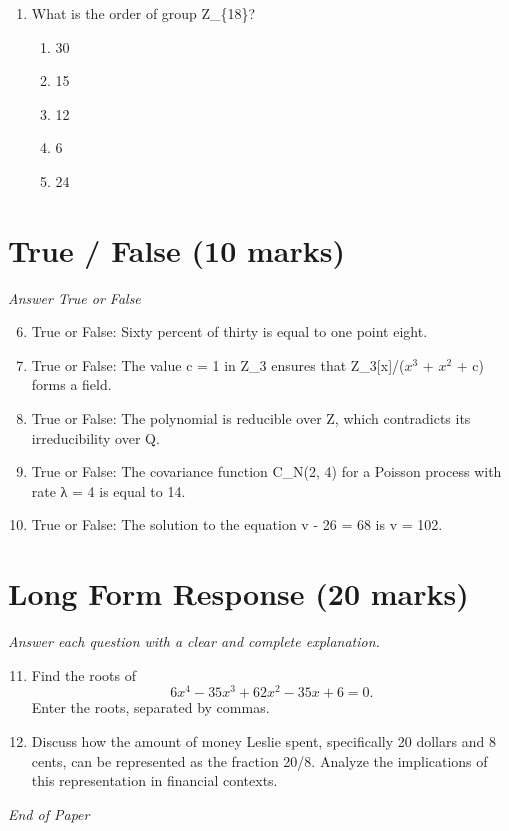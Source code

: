 \documentclass[12pt]{article}
\begin{document}
\begin{enumerate}[label=\arabic*.]
\begin{enumerate}[label=(\alph*)]
    \item 42
    \item 30
    \item -42
    \item -36
    \item 1 over 216
\end{enumerate}
\item What is the order of group Z\_\{18\}?
\begin{enumerate}[label=(\alph*)]
    \item 30
    \item 15
    \item 12
    \item 6
    \item 24
\end{enumerate}
\end{enumerate}

\section*{True / False (10 marks)}
\textit{Answer True or False}
\begin{enumerate}[label=\arabic*.]
\setcounter{enumi}{5}
\item True or False: Sixty percent of thirty is equal to one point eight.
\item True or False: The value c = 1 in Z\_3 ensures that Z\_3[x]/($x^3$ + $x^2$ + c) forms a field.
\item True or False: The polynomial is reducible over Z, which contradicts its irreducibility over Q.
\item True or False: The covariance function C\_N(2, 4) for a Poisson process with rate λ = 4 is equal to 14.
\item True or False: The solution to the equation v - 26 = 68 is v = 102.
\end{enumerate}

\section*{Long Form Response (20 marks)}
\textit{Answer each question with a clear and complete explanation.}
\begin{enumerate}[label=\arabic*.]
\setcounter{enumi}{10}
\item Find the roots of \[6 x^4 - 35 x^3 + 62 x^2 - 35 x + 6 = 0.\]Enter the roots, separated by commas.
\item Discuss how the amount of money Leslie spent, specifically 20 dollars and 8 cents, can be represented as the fraction 20/8. Analyze the implications of this representation in financial contexts.
\end{enumerate}

\vfill
\noindent\textit{End of Paper}
\end{document}
